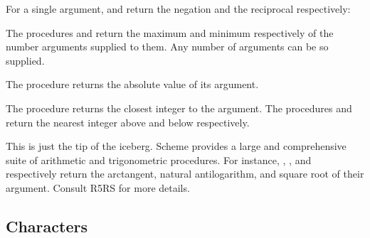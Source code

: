 \n For a single argument, \q{-} and \q{/} return the negation
and the reciprocal respectively:



\n The procedures  and  return the maximum and
minimum respectively of the number arguments supplied to
them.  Any number of arguments can be so supplied.



\n The procedure  returns the absolute value of
its argument.



\n The procedure  returns the closest integer to the
argument. The procedures  and  return the nearest
integer above and below respectively.



\n This is just the tip of the iceberg.  Scheme
provides a large and comprehensive suite of arithmetic
and trigonometric procedures.  For instance, ,
, and  respectively return the
arctangent, natural antilogarithm, and 
square root of their argument.  Consult
R5RS \cite{r5rs} for more details.


\subsection{Characters}

